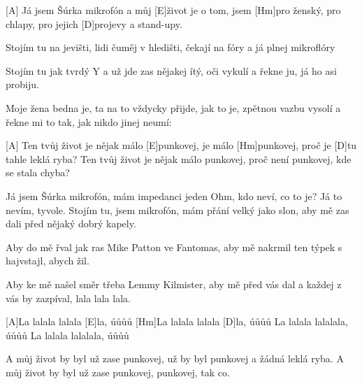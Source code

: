 
[A] Já jsem Šúrka mikrofón 
a můj [E]\null život je o tom, 
jsem [Hm]pro ženský, pro chlapy, 
pro jejich [D]projevy a stand-upy.

Stojím tu na jevišti, 
lidi čuměj v hledišti, 
čekají na fóry 
a já plnej mikroflóry

Stojím tu jak tvrdý Y
a už jde zas nějakej ítý,
oči vykulí a řekne ju,
já ho asi probiju.

Moje žena bedna je,
ta na to vždycky přijde, jak to je,
zpětnou vazbu vysolí
a řekne mi to tak, jak nikdo jinej neumí:

[A] Ten tvůj život je nějak málo [E]punkovej,
je málo [Hm]punkovej, proč je [D]tu tahle leklá ryba?
Ten tvůj život je nějak málo punkovej,
proč není punkovej, kde se stala chyba?

Já jsem Šúrka mikrofón,
mám impedanci jeden Ohm,
kdo neví, co to je?
Já to nevím, tyvole.
\slpc
Stojím tu, jsem mikrofón,
mám přání velký jako slon,
aby mě zas dali
před nějaký dobrý kapely.

Aby do mě řval jak ras
Mike Patton ve Fantomas,
aby mě nakrmil
ten týpek s hajvstajl,
abych žil.

Aby ke mě našel směr
třeba Lemmy Kilmister,
aby mě před vás dal
a každej z vás by zazpíval, lala lala lala.

[A]La lalala lalala [E]la, úůůů
[Hm]La lalala lalala [D]la, úůůů
La lalala lalalala, úůůů
La lalala lalalala, úůůů

A můj život by byl už zase punkovej,
už by byl punkovej
a žádná leklá ryba.
A můj život by byl už zase punkovej,
punkovej, tak co.